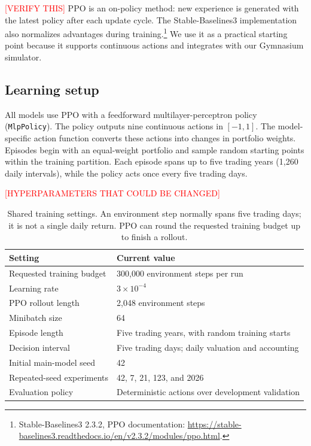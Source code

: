 \documentclass[11pt,letterpaper]{article}
\begin{document}
\textcolor{red}{[VERIFY THIS]}
PPO is an on-policy method: new experience is generated with the latest policy
after each update cycle. The Stable-Baselines3 implementation also normalizes
advantages during training.\footnote{Stable-Baselines3 2.3.2, PPO documentation:
\url{https://stable-baselines3.readthedocs.io/en/v2.3.2/modules/ppo.html}.}
We use it as a practical starting point because it supports continuous actions
and integrates with our Gymnasium simulator.


\subsection{Learning setup}

All models use PPO with a feedforward multilayer-perceptron policy
(\texttt{MlpPolicy}). The policy outputs nine continuous actions in $[-1,1]$.
The model-specific action function converts these actions into
changes in portfolio weights. Episodes begin with an equal-weight portfolio
 and sample random starting points within the training partition. Each 
 episode spans up to five trading years (1,260 daily intervals), while 
 the policy acts once every five trading days.


 \textcolor{red}{[HYPERPARAMETERS THAT COULD BE CHANGED]}

\begin{table}[htbp]
\centering
\small
\begin{tabularx}{\linewidth}{@{}l Y@{}}
\toprule
Setting & Current value \\
\midrule
Requested training budget & 300,000 environment steps per run \\
Learning rate & $3\times10^{-4}$ \\
PPO rollout length & 2,048 environment steps \\
Minibatch size & 64 \\
Episode length & Five trading years, with random training starts \\
Decision interval & Five trading days; daily valuation and accounting \\
Initial main-model seed & 42 \\
Repeated-seed experiments & 42, 7, 21, 123, and 2026 \\
Evaluation policy & Deterministic actions over development validation \\
\bottomrule
\end{tabularx}
\caption{Shared training settings. An environment step normally spans five
trading days; it is not a single daily return. PPO can round the requested
training budget up to finish a rollout.}
\end{table}
\end{document}
